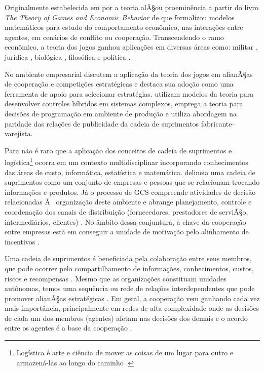 \documentclass[
	article,			        %
	11pt,				          %
	oneside,			        %
	a4paper,			        %
	english,			        %
	brazil,				        %
	sumario=tradicional
]{abntex2}\usepackage[]{graphicx}\usepackage[]{color}
\begin{document}
Originalmente estabelecida em \citeyear{Cournot.1838} por  a teoria alÃ§ou proeminência a partir do livro \emph{The Theory of Games and Economic Behavior} de  que formalizou modelos matemáticos para estudo do comportamento econômico, nas interações entre agentes, em cenários de conflito ou cooperação. Transcendendo o ramo econômico, a teoria dos jogos ganhou aplicações em diversas áreas como: militar \cite{Haywood.1954,RAND.2004}, jurídica \cite{Rosa.2014}, biológica \cite{Smith.1982}, filosófica \cite{Lewis.2002} e política \cite{Levy.2003}. 

No ambiente empresarial  discutem a aplicação da teoria dos jogos em alianÃ§as de cooperação e competições estratégicas e  destaca sua adoção como uma ferramenta de apoio para selecionar estratégias.  utilizam modelos da teoria para desenvolver controles híbridos em sistemas complexos,  emprega a teoria para decisões de programação em ambiente de produção e  utiliza abordagem na paridade das relações de publicidade da cadeia de suprimentos fabricante--varejista.

Para  não é raro que a aplicação dos conceitos de cadeia de suprimentos e logística\footnote{Logística é arte e ciência de mover as coisas de um lugar para outro e armazená-las ao longo do caminho \cite[p.~370]{Fawcett.2000}.} ocorra em um contexto multidisciplinar incorporando conhecimentos das áreas de custo, informática, estatística e matemática.  delineia uma cadeia de suprimentos como um conjunto de empresas e pessoas que se relacionam trocando informações e produtos. Já o processo de GCS compreende atividades de decisão relacionadas Ã  organização deste ambiente \cite{Fredendall.2001} e abrange planejamento, controle e coordenação dos canais de distribuição (fornecedores, prestadores de serviÃ§o, intermediários, clientes) \cite{Panitz.2007}. No âmbito dessa conjuntura, a chave da cooperação entre empresas está em conseguir a unidade de motivação pelo alinhamento de incentivos \cite{Cao.2012}. 

Uma cadeia de suprimentos é beneficiada pela colaboração entre seus membros, que pode ocorrer pelo compartilhamento de informações, conhecimentos, custos, riscos e recompensas \cite{Simatupang.2002}. Mesmo que as organizações constituam unidades autônomas, temos uma sequência ou rede de relações interdependentes que pode promover alianÃ§as estratégicas \cite{Chen.2004}. Em geral, a cooperação vem ganhando cada vez mais importância, principalmente em redes de alta complexidade \cite{Drechsel.2010} onde as decisões de cada um dos membros (agentes) afetam nas decisões dos demais e o acordo entre os agentes é a base da cooperação \cite{Young.1994}.
\end{document}
